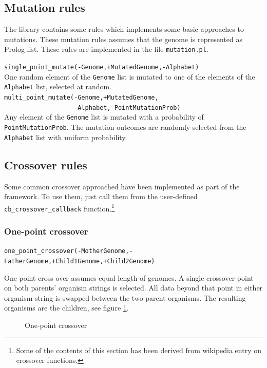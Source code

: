 \documentclass{article}
\begin{document}
\subsection{Mutation rules}
\label{sec:mutation_rules}

The library contains some rules which implements some basic approaches to mutations. These mutation rules assumes that the genome is represented as Prolog list. These rules are implemented in the file 
\verb|mutation.pl|.

\bigskip
\noindent
\verb|single_point_mutate(-Genome,+MutatedGenome,-Alphabet)|\\
One random element of the \verb|Genome| list is mutated to one of the elements of the \verb|Alphabet| list, selected at random.\\

\bigskip
\noindent
\verb|multi_point_mutate(-Genome,+MutatedGenome,|\\
\verb|                   -Alphabet,-PointMutationProb)| \\
Any element of the  \verb|Genome| list is mutated with a probability of \texttt{PointMutationProb}. 
The mutation outcomes are randomly selected from the \verb|Alphabet| list with uniform probability.

\subsection{Crossover rules}
\label{sec:crossover_rules}


Some common crossover approached have been implemented as part of the framework. To use them, just call them from the user-defined \verb|cb_crossover_callback| function.\footnote{Some of the contents of this section has been derived from wikipedia entry on crossover functions.}

\subsubsection{One-point crossover}

\verb|one_point_crossover(-MotherGenome,-FatherGenome,+Child1Genome,+Child2Genome)|
\medskip

One point cross over assumes equal length of genomes. A single crossover point on both parents' organism strings is selected. All data beyond that point in either organism string is swapped between the two parent organisms. The resulting organisms are the children, see figure \ref{fig:one_point_crossover}.
\begin{figure}[htb]
\caption{One-point crossover}
\label{fig:one_point_crossover}
\centerline{ }
\end{figure}
\end{document}
